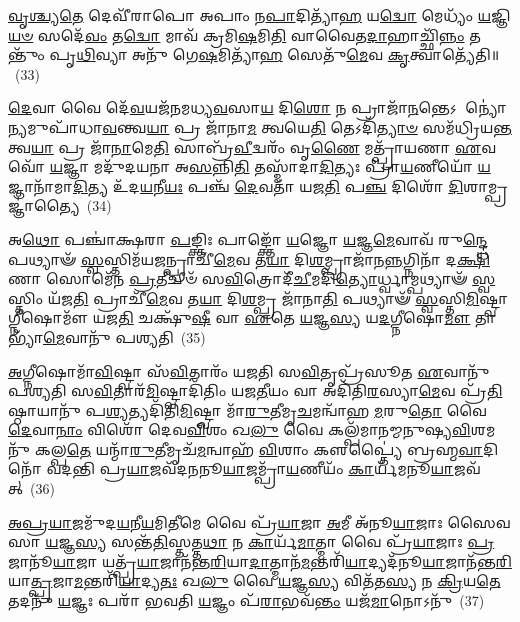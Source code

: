 \-\ul{𑌵𑍃}\-\-\ul{𑌶𑍍𑌚𑍍𑌯}\-\-\ul{𑌤𑍇} 𑌦𑍇𑌵𑍀᳴𑌰𑌾𑌪𑍋 𑌅𑌪𑌾𑌂 𑌨\-\ul{𑌪𑌾}\-𑌦𑌿𑌤𑍍𑌯𑌾᳴\-\ul{𑌹} 𑌯\-\ul{𑌦𑍍𑌵𑍋} 𑌮𑍇𑌧𑍍𑌯𑌂᳴ \ul{𑌯}\-𑌜𑍍𑌞𑌿\-\ul{𑌯}\-\-\ul{𑍞} 𑌸𑌦𑍇᳴\-\ul{𑌵𑌂} 𑌤\-\ul{𑌦𑍍𑌵𑍋} 𑌮𑌾𑌵᳴ 𑌕𑍍𑌰𑌮𑌿\-\ul{𑌷}\-𑌮𑌿\-\ul{𑌤𑌿} 𑌵𑌾𑌵𑍈𑌤\-\ul{𑌦𑌾}\-𑌹𑌾𑌚𑍍𑌛𑌿᳴\-\ul{𑌨𑍍𑌨𑌂} 𑌤𑌨𑍍𑌤𑍁𑌂᳴ 𑌪𑍃\-\ul{𑌥𑌿}\-𑌵𑍍𑌯𑌾 𑌅𑌨𑍁᳴ 𑌗𑍇\-\ul{𑌷}\-𑌮𑌿𑌤𑍍𑌯𑌾᳴\-\ul{𑌹} 𑌸𑍇𑌤𑍁᳴\-\ul{𑌮𑍇}\-𑌵 \ul{𑌕𑍃}\-𑌤𑍍𑌵𑌾𑌤𑍍𑌯𑍇᳴𑌤𑌿॥~(33)

{}%

\-\ul{𑌦𑍇}\-𑌵𑌾 𑌵𑍈 𑌦𑍇᳴\-\ul{𑌵}\-𑌯𑌜᳴𑌨𑌮𑌧𑍍𑌯\-\ul{𑌵}\-𑌸𑌾\-\ul{𑌯} 𑌦𑌿\-\ul{𑌶𑍋} 𑌨 𑌪𑍍𑌰𑌾𑌜𑌾᳴\-\ul{𑌨}\-𑌨𑍍𑌤𑍇\-𑌽 𑌨𑍍𑌯𑍋॑𑌨𑍍𑌯𑌮𑍁𑌪𑌾᳴𑌧𑌾\-\ul{𑌵}\-𑌨𑍍𑌤𑍍𑌵\-\ul{𑌯𑌾} 𑌪𑍍𑌰 𑌜𑌾᳴𑌨𑌾\-\ul{𑌮} 𑌤𑍍𑌵𑌯𑍇\-\ul{𑌤𑌿} 𑌤𑍇\-𑌽𑌦𑌿᳴\-\ul{𑌤𑍍𑌯𑌾}\-\-\ul{𑍞} 𑌸𑌮᳴𑌧𑍍𑌰𑌿𑌯\-\ul{𑌨𑍍𑌤} 𑌤𑍍𑌵\-\ul{𑌯𑌾} 𑌪𑍍𑌰 𑌜𑌾᳴\-\ul{𑌨𑌾}\-𑌮𑍇\-\ul{𑌤𑌿} 𑌸𑌾𑌬𑍍𑌰᳴\-\ul{𑌵𑍀}\-𑌦𑍍𑌵𑌰𑌂᳴ 𑌵𑍃\-\ul{𑌣𑍈} 𑌮𑌤𑍍𑌪𑍍𑌰𑌾᳴𑌯𑌣𑌾 \ul{𑌏}\-𑌵 𑌵𑍋᳴ \ul{𑌯}\-𑌜𑍍𑌞𑌾 𑌮𑌦𑍁᳴𑌦𑌯𑌨𑌾 𑌅\-\ul{𑌸}\-𑌨𑍍𑌨𑌿\-\ul{𑌤𑌿} 𑌤𑌸𑍍𑌮𑌾᳴𑌦𑌾\-\ul{𑌦𑌿}\-𑌤𑍍𑌯𑌃 𑌪𑍍𑌰𑌾᳴\-\ul{𑌯}\-𑌣𑍀𑌯𑍋᳴ \ul{𑌯}\-𑌜𑍍𑌞𑌾𑌨𑌾᳴𑌮𑌾\-\ul{𑌦𑌿}\-𑌤𑍍𑌯 𑌉᳴𑌦\-\ul{𑌯}\-𑌨𑍀\-\ul{𑌯𑌃} 𑌪𑌞𑍍𑌚᳴ \ul{𑌦𑍇}\-𑌵𑌤𑌾᳴ 𑌯𑌜\-\ul{𑌤𑌿} 𑌪\-\ul{𑌞𑍍𑌚} 𑌦𑌿𑌶𑍋᳴ \ul{𑌦𑌿}\-𑌶𑌾𑌮𑍍𑌪𑍍𑌰𑌜𑍍𑌞𑌾॑𑌤𑍍𑌯𑍈~(34)

𑌅\-\ul{𑌥𑍋} 𑌪𑌞𑍍𑌚𑌾॑𑌕𑍍𑌷𑌰𑌾 \ul{𑌪}\-𑌙𑍍𑌕𑍍𑌤𑌿𑌃 𑌪𑌾𑌙𑍍𑌕𑍍𑌤𑍋᳴ \ul{𑌯}\-𑌜𑍍𑌞𑍋 \ul{𑌯}\-𑌜𑍍𑌞\-\ul{𑌮𑍇}\-𑌵𑌾𑌵᳴ 𑌰𑍁\-\ul{𑌨𑍍𑌦𑍍𑌧𑍇} 𑌪𑌥𑍍𑌯𑌾𑍟᳴ \ul{𑌸𑍍𑌵}\-𑌸𑍍𑌤𑌿𑌮᳴𑌯\-\ul{𑌜}\-𑌨𑍍𑌪𑍍𑌰𑌾𑌚𑍀᳴\-\ul{𑌮𑍇}\-𑌵 𑌤\-\ul{𑌯𑌾} 𑌦𑌿\-\ul{𑌶}\-𑌮𑍍𑌪𑍍𑌰𑌾𑌜𑌾᳴𑌨\-\ul{𑌨𑍍𑌨}\-𑌗𑍍𑌨𑌿𑌨𑌾᳴ 𑌦\-\ul{𑌕𑍍𑌷𑌿}\-𑌣𑌾 𑌸𑍋𑌮𑍇᳴𑌨 \ul{𑌪𑍍𑌰}\-𑌤𑍀𑌚𑍀𑍞᳴ 𑌸\-\ul{𑌵𑌿}\-𑌤𑍍𑌰𑍋𑌦𑍀᳴\-\ul{𑌚𑍀}\-𑌮𑌦𑌿᳴\-\ul{𑌤𑍍𑌯𑍋}\-𑌰𑍍𑌧𑍍𑌵𑌾𑌮𑍍𑌪𑌥𑍍𑌯𑌾𑍟᳴ \ul{𑌸𑍍𑌵}\-𑌸𑍍𑌤𑌿𑌂 𑌯᳴𑌜\-\ul{𑌤𑌿} 𑌪𑍍𑌰𑌾𑌚𑍀᳴\-\ul{𑌮𑍇}\-𑌵 𑌤\-\ul{𑌯𑌾} 𑌦𑌿\-\ul{𑌶}\-𑌮𑍍𑌪𑍍𑌰 𑌜𑌾᳴𑌨𑌾\-\ul{𑌤𑌿} 𑌪𑌥𑍍𑌯𑌾𑍟᳴ \ul{𑌸𑍍𑌵}\-𑌸𑍍𑌤𑌿\-\ul{𑌮𑌿}\-𑌷𑍍𑌟𑍍𑌵𑌾𑌗𑍍𑌨𑍀𑌷𑍋𑌮𑍗᳴ 𑌯𑌜\-\ul{𑌤𑌿} 𑌚𑌕𑍍𑌷𑍁᳴\-\ul{𑌷𑍀} 𑌵𑌾 \ul{𑌏}\-𑌤𑍇 \ul{𑌯}\-𑌜𑍍𑌞\-\ul{𑌸𑍍𑌯} 𑌯\-\ul{𑌦}\-𑌗𑍍𑌨𑍀𑌷𑍋\-\ul{𑌮𑍗} 𑌤𑌾𑌭𑍍𑌯𑌾᳴\-\ul{𑌮𑍇}\-𑌵𑌾𑌨𑍁᳴ 𑌪𑌶𑍍𑌯𑌤𑌿~(35)

\-\ul{𑌅}\-𑌗𑍍𑌨𑍀𑌷𑍋𑌮𑌾᳴\-\ul{𑌵𑌿}\-𑌷𑍍𑌟𑍍𑌵𑌾 𑌸᳴\-\ul{𑌵𑌿}\-𑌤𑌾𑌰𑌂᳴ 𑌯𑌜𑌤𑌿 𑌸\-\ul{𑌵𑌿}\-𑌤𑍃𑌪𑍍𑌰᳴𑌸𑍂𑌤 \ul{𑌏}\-𑌵𑌾𑌨𑍁᳴ 𑌪𑌶𑍍𑌯𑌤𑌿 𑌸\-\ul{𑌵𑌿}\-𑌤𑌾𑌰᳴\-\ul{𑌮𑌿}\-𑌷𑍍𑌟𑍍𑌵𑌾𑌦𑌿᳴𑌤𑌿𑌂 𑌯𑌜\-\ul{𑌤𑍀}\-𑌯𑌂 𑌵𑌾 𑌅𑌦𑌿᳴𑌤𑌿\-\ul{𑌰}\-𑌸𑍍𑌯𑌾\-\ul{𑌮𑍇}\-𑌵 𑌪𑍍𑌰᳴\-\ul{𑌤𑌿}\-𑌷𑍍𑌠𑌾𑌯𑌾𑌨𑍁᳴ 𑌪\-\ul{𑌶𑍍𑌯}\-𑌤𑍍𑌯𑌦𑌿᳴𑌤𑌿\-\ul{𑌮𑌿}\-𑌷𑍍𑌟𑍍𑌵𑌾 𑌮𑌾᳴\-\ul{𑌰𑍁}\-𑌤𑍀𑌮𑍃\-\ul{𑌚}\-𑌮𑌨𑍍𑌵𑌾᳴𑌹 \ul{𑌮}\-𑌰𑍁\-\ul{𑌤𑍋} 𑌵𑍈 \ul{𑌦𑍇}\-𑌵𑌾\-\ul{𑌨𑌾𑌂} 𑌵𑌿𑌶𑍋᳴ 𑌦𑍇𑌵\-\ul{𑌵𑌿}\-𑌶𑌂 𑌖\-\ul{𑌲𑍁} 𑌵𑍈 𑌕𑌲𑍍𑌪᳴𑌮𑌾𑌨𑌮𑍍𑌮𑌨𑍁𑌷𑍍𑌯\-\ul{𑌵𑌿}\-𑌶\-𑌮𑌨𑍁᳴ 𑌕𑌲𑍍𑌪\-\ul{𑌤𑍇} 𑌯𑌨𑍍𑌮𑌾᳴\-\ul{𑌰𑍁}\-𑌤𑍀𑌮𑍃𑌚᳴\-\ul{𑌮}\-𑌨𑍍𑌵𑌾𑌹᳴ \ul{𑌵𑌿}\-𑌶𑌾𑌂 𑌕𑍢𑌪𑍍𑌤𑍍𑌯𑍈॑ 𑌬𑍍𑌰𑌹𑍍𑌮\-\ul{𑌵𑌾}\-𑌦𑌿𑌨𑍋᳴ 𑌵𑌦𑌨𑍍𑌤𑌿 𑌪𑍍𑌰\-\ul{𑌯𑌾}\-𑌜𑌵᳴𑌦𑌨𑌨𑍂\-\ul{𑌯𑌾}\-𑌜𑌮𑍍𑌪𑍍𑌰𑌾᳴\-\ul{𑌯}\-𑌣𑍀𑌯𑌂᳴ \ul{𑌕𑌾}\-𑌰𑍍𑌯᳴𑌮𑌨𑍂\-\ul{𑌯𑌾}\-𑌜𑌵᳴𑌤𑍍~(36)

\-\ul{𑌅}\-\-\ul{𑌪𑍍𑌰}\-\-\ul{𑌯𑌾}\-𑌜𑌮𑍁᳴𑌦\-\ul{𑌯}\-𑌨𑍀\-\ul{𑌯}\-𑌮𑌿\-\ul{𑌤𑍀}\-𑌮𑍇 𑌵𑍈 𑌪𑍍𑌰᳴\-\ul{𑌯𑌾}\-𑌜𑌾 \ul{𑌅}\-𑌮𑍀 𑌅᳴𑌨𑍂\-\ul{𑌯𑌾}\-𑌜𑌾𑌃 𑌸𑍈𑌵 𑌸𑌾 \ul{𑌯}\-𑌜𑍍𑌞\-\ul{𑌸𑍍𑌯} 𑌸𑌨𑍍𑌤᳴\-\ul{𑌤𑌿}\-𑌸𑍍𑌤𑌤𑍍𑌤\-\ul{𑌥𑌾} 𑌨 \ul{𑌕𑌾}\-𑌰𑍍𑌯᳴\-\ul{𑌮𑌾}\-𑌤𑍍𑌮𑌾 𑌵𑍈 𑌪𑍍𑌰᳴\-\ul{𑌯𑌾}\-𑌜𑌾𑌃 \ul{𑌪𑍍𑌰}\-𑌜𑌾𑌨𑍂᳴\-\ul{𑌯𑌾}\-𑌜𑌾 𑌯𑌤𑍍𑌪𑍍𑌰᳴\-\ul{𑌯𑌾}\-𑌜𑌾𑌨᳴𑌨𑍍𑌤\-\ul{𑌰𑌿}\-𑌯𑌾\-\ul{𑌦𑌾}\-𑌤𑍍𑌮𑌾𑌨᳴\-\ul{𑌮}\-𑌨𑍍𑌤𑌰𑌿᳴\-\ul{𑌯𑌾}\-𑌦𑍍𑌯𑌦᳴𑌨𑍂\-\ul{𑌯𑌾}\-𑌜𑌾𑌨᳴𑌨𑍍𑌤\-\ul{𑌰𑌿}\-𑌯𑌾\-\ul{𑌤𑍍𑌪𑍍𑌰}\-𑌜𑌾\-\ul{𑌮}\-𑌨𑍍𑌤𑌰𑌿᳴\-\ul{𑌯𑌾}\-𑌦𑍍𑌯\-\ul{𑌤𑌃} 𑌖\-\ul{𑌲𑍁} 𑌵𑍈 \ul{𑌯}\-𑌜𑍍𑌞\-\ul{𑌸𑍍𑌯} 𑌵𑌿𑌤᳴𑌤\-\ul{𑌸𑍍𑌯} 𑌨 \ul{𑌕𑍍𑌰𑌿}\-𑌯\-\ul{𑌤𑍇} 𑌤𑌦𑌨𑍁᳴ \ul{𑌯}\-𑌜𑍍𑌞𑌃 𑌪𑌰𑌾᳴ 𑌭𑌵𑌤𑌿 \ul{𑌯}\-𑌜𑍍𑌞𑌂 𑌪᳴\-\ul{𑌰𑌾}\-𑌭𑌵᳴\-\ul{𑌨𑍍𑌤𑌂} 𑌯𑌜᳴\-\ul{𑌮𑌾}\-𑌨𑍋\-𑌽𑌨𑍁᳴~(37)

